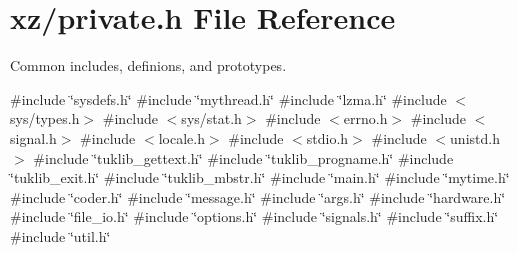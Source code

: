 \section{xz/private.h File Reference}
\label{private_8h}


Common includes, definions, and prototypes.  


{\ttfamily \#include \char`\"{}sysdefs.\+h\char`\"{}}\newline
{\ttfamily \#include \char`\"{}mythread.\+h\char`\"{}}\newline
{\ttfamily \#include \char`\"{}lzma.\+h\char`\"{}}\newline
{\ttfamily \#include $<$sys/types.\+h$>$}\newline
{\ttfamily \#include $<$sys/stat.\+h$>$}\newline
{\ttfamily \#include $<$errno.\+h$>$}\newline
{\ttfamily \#include $<$signal.\+h$>$}\newline
{\ttfamily \#include $<$locale.\+h$>$}\newline
{\ttfamily \#include $<$stdio.\+h$>$}\newline
{\ttfamily \#include $<$unistd.\+h$>$}\newline
{\ttfamily \#include \char`\"{}tuklib\+\_\+gettext.\+h\char`\"{}}\newline
{\ttfamily \#include \char`\"{}tuklib\+\_\+progname.\+h\char`\"{}}\newline
{\ttfamily \#include \char`\"{}tuklib\+\_\+exit.\+h\char`\"{}}\newline
{\ttfamily \#include \char`\"{}tuklib\+\_\+mbstr.\+h\char`\"{}}\newline
{\ttfamily \#include \char`\"{}main.\+h\char`\"{}}\newline
{\ttfamily \#include \char`\"{}mytime.\+h\char`\"{}}\newline
{\ttfamily \#include \char`\"{}coder.\+h\char`\"{}}\newline
{\ttfamily \#include \char`\"{}message.\+h\char`\"{}}\newline
{\ttfamily \#include \char`\"{}args.\+h\char`\"{}}\newline
{\ttfamily \#include \char`\"{}hardware.\+h\char`\"{}}\newline
{\ttfamily \#include \char`\"{}file\+\_\+io.\+h\char`\"{}}\newline
{\ttfamily \#include \char`\"{}options.\+h\char`\"{}}\newline
{\ttfamily \#include \char`\"{}signals.\+h\char`\"{}}\newline
{\ttfamily \#include \char`\"{}suffix.\+h\char`\"{}}\newline
{\ttfamily \#include \char`\"{}util.\+h\char`\"{}}\newline
